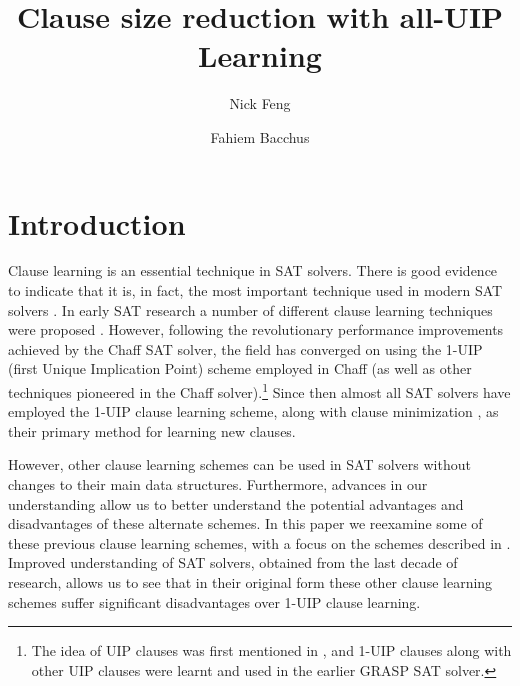\documentclass[runningheads]{llncs}
\title{Clause size reduction with all-UIP Learning}
\author{Nick Feng \and Fahiem Bacchus}
\institute{Department of Computer Science, University of Toronto, Canada, 
  \email{\{nfeng,fbacchus\}@cs.toronto.edu}}
\newcommand{\sat}{SAT\xspace}
\begin{document}
\maketitle              %
% 
\begin{abstract}
\end{abstract}

\section{Introduction}
Clause learning is an essential technique in \sat solvers. There is good
evidence to indicate that it is, in fact, the most important technique
used in modern \sat solvers \cite{DBLP:conf/sat/KatebiSS11}. In early
\sat research a number of different clause learning techniques were
proposed
\cite{DBLP:conf/iccad/ZhangMMM01,DBLP:conf/iccad/SilvaS96,DBLP:journals/tc/Marques-SilvaS99,DBLP:conf/aaai/BayardoS97}.
However, following the revolutionary performance improvements achieved
by the Chaff \sat solver, the field has converged on using the 1-UIP
(first Unique Implication Point) scheme
\cite{DBLP:conf/iccad/ZhangMMM01} employed in Chaff
\cite{DBLP:conf/dac/MoskewiczMZZM01} (as well as other techniques
pioneered in the Chaff solver).\footnote{The idea of UIP clauses was
  first mentioned in \cite{DBLP:journals/tc/Marques-SilvaS99}, and
  1-UIP clauses along with other UIP clauses were learnt and used in
  the earlier GRASP \sat solver.} Since then almost all \sat solvers
have employed the 1-UIP clause learning scheme, along with clause
minimization \cite{DBLP:conf/sat/SorenssonB09}, as their primary
method for learning new clauses.

However, other clause learning schemes can be used in SAT solvers
without changes to their main data structures. Furthermore, advances
in our understanding allow us to better understand the potential
advantages and disadvantages of these alternate schemes. In this paper
we reexamine some of these previous clause learning schemes, with a
focus on the schemes described in
\cite{DBLP:conf/iccad/ZhangMMM01}. Improved understanding of \sat
solvers, obtained from the last decade of research, allows us to see
that in their original form these other clause learning schemes suffer
significant disadvantages over 1-UIP clause learning.
\end{document}
